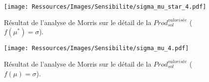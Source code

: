 \begin{figure}
    \centering
    \texttt{[image: Ressources/Images/Sensibilite/sigma\_mu\_star\_4.pdf]}
    \caption[Résultat de l’analyse de Morris sur le détail de la
             $Prod_{sol}^{valorisée}$ ($f(\mu^{*}) = \sigma$)]
            {Résultat de l’analyse de Morris sur le détail de la
             $Prod_{sol}^{valorisée}$ ($f(\mu^{*}) = \sigma$).}
    \label{fig:prod_sol_valorisee_mu_star}
\end{figure}

\begin{figure}
    \centering
    \texttt{[image: Ressources/Images/Sensibilite/sigma\_mu\_4.pdf]}
    \caption[Résultat de l’analyse de Morris sur le détail de la
             $Prod_{sol}^{valorisée}$ ($f(\mu) = \sigma$)]
            {Résultat de l’analyse de Morris sur le détail de la
             $Prod_{sol}^{valorisée}$ ($f(\mu) = \sigma$).}
    \label{fig:prod_sol_valorisee_mu}
\end{figure}
